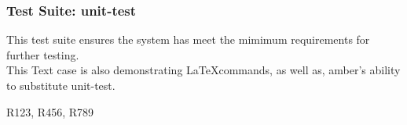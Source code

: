 \subsubsection{Test Suite: unit-test}
\begin{description}[align=right,leftmargin=*,labelindent=3cm]
\item[Purpose:] This test suite ensures the system has meet the mimimum requirements for further testing. \\ This Text case is also demonstrating \LaTeX commands, as well as, amber's ability to substitute unit-test.

\item[Requirement:] R123, R456, R789
\end{description}
